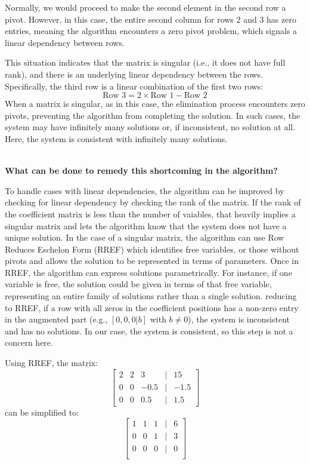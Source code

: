 \documentclass[12pt]{amsart}
\begin{document}
\begin{enumerate}[1.]
Normally, we would proceed to make the second element in the second row a pivot. However, in this case, the entire second column for rows 2 and 3 has zero entries, meaning the algorithm encounters a zero pivot problem, which signals a linear dependency between rows.

This situation indicates that the matrix is singular (i.e., it does not have full rank), and there is an underlying linear dependency between the rows. Specifically, the third row is a linear combination of the first two rows:
\begin{equation*}
\text{Row 3} = 2 \times \text{Row 1} - \text{Row 2}
\end{equation*}
When a matrix is singular, as in this case, the elimination process encounters zero pivots, preventing the algorithm from completing the solution. In such cases, the system may have infinitely many solutions or, if inconsistent, no solution at all. Here, the system is consistent with infinitely many solutions.

\\

\noindent \textbf{What can be done to remedy this shortcoming in the algorithm?}

To handle cases with linear dependencies, the algorithm can be improved by checking for linear dependency by checking the rank of the matrix. If the rank of the coefficient matrix is less than the number of vaiables, that heavily implies a singular matrix and lets the algorithm know that the system does not have a unique solution. In the case of a singular matrix, the algorithm can use Row Reduces Eschelon Form (RREF)  which identifies free variables, or those without pivots and allows the solution to be represented in terms of parameters. 
Once in RREF, the algorithm can express solutions parametrically. For instance, if one variable is free, the solution could be given in terms of that free variable, representing an entire family of solutions rather than a single solution.
reducing to RREF, if a row with all zeros in the coefficient positions has a non-zero entry in the augmented part (e.g., \([0, 0, 0 | b]\) with \( b \neq 0 \)), the system is inconsistent and has no solutions. In our case, the system is consistent, so this step is not a concern here.
\end{enumerate}
Using RREF, the matrix:
\begin{equation*}
\begin{bmatrix}
2 & 2 & 3 & | & 15 \\
0 & 0 & -0.5 & | & -1.5 \\
0 & 0 & 0.5 & | & 1.5
\end{bmatrix}
\end{equation*}
can be simplified to:
\begin{equation*}
\begin{bmatrix}
1 & 1 & 1 & | & 6 \\
0 & 0 & 1 & | & 3 \\
0 & 0 & 0 & | & 0 \\
\end{bmatrix}
\end{equation*}
\end{document}
